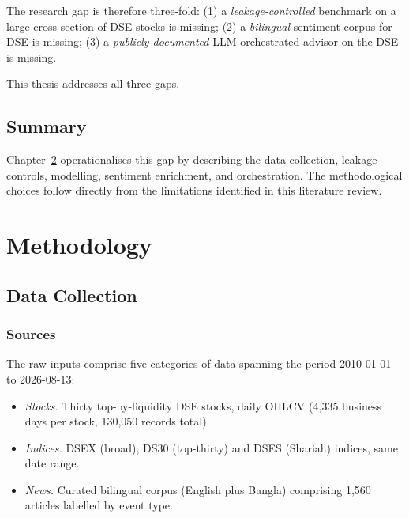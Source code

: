 \documentclass[12pt,a4paper,oneside]{report}
\begin{document}
The research gap is therefore three-fold:
(1) a \emph{leakage-controlled} benchmark on a large cross-section
of DSE stocks is missing;
(2) a \emph{bilingual} sentiment corpus for DSE is missing;
(3) a \emph{publicly documented} \ac{LLM}-orchestrated advisor on
the DSE is missing.

This thesis addresses all three gaps.

\section{Summary}

Chapter~\ref{ch:method} operationalises this gap by describing the
data collection, leakage controls, modelling, sentiment enrichment,
and orchestration. The methodological choices follow directly from
the limitations identified in this literature review.

\chapter{Methodology}
\label{ch:method}

\section{Data Collection}

\subsection{Sources}

The raw inputs comprise five categories of data spanning the period
2010-01-01 to 2026-08-13:

\begin{itemize}[leftmargin=*,itemsep=2pt]
  \item \emph{Stocks.} Thirty top-by-liquidity DSE stocks, daily
        OHLCV (4{,}335 business days per stock, 130{,}050 records
        total).
  \item \emph{Indices.} DSEX (broad), DS30 (top-thirty) and DSES
        (Shariah) indices, same date range.
  \item \emph{News.} Curated bilingual corpus (English plus Bangla)
        comprising 1{,}560 articles labelled by event type.
\end{itemize}
\end{document}
